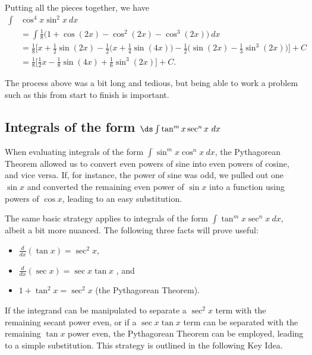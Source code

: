 \begin{example}
Putting all the pieces together, we have
\begin{align*}
	\int &\cos^4x\sin^2x\ dx \\
	&=\int \frac18\big(1+\cos(2x)-\cos^2(2x)-\cos^3(2x)\big)\ dx \\
	&= \frac18
	\Big[x+\frac12\sin(2x)-\frac12\big(x+\frac14\sin(4x)\big)
	-\frac12\Big(\sin(2x)-\frac13\sin^3(2x)\Big)\Big]
	+C \\
	&=\frac18\Big[\frac12x-\frac18\sin(4x)+\frac16\sin^3(2x)\Big]+C.
\end{align*}
\end{example}

The process above was a bit long and tedious, but being able to work a problem such as this from start to finish is important.

\subsection{\texorpdfstring{Integrals of the form $\ds\int\tan^mx\sec^nx\ dx$}{Integrands of the form (tan x)\^{}m (sec x)\^{}n}}

When evaluating integrals of the form $\int \sin^mx\cos^nx\ dx$, the Pythagorean Theorem allowed us to convert even powers of sine into even powers of cosine, and vice versa. If, for instance, the power of sine was odd, we pulled out one $\sin x$ and converted the remaining even power of $\sin x$ into a function using powers of $\cos x$, leading to an easy substitution.

The same basic strategy applies to integrals of the form $\int \tan^mx\sec^n x\ dx$, albeit a bit more nuanced. The following three facts will prove useful:
\begin{itemize}
\item $\frac{d}{dx}(\tan x) = \sec^2x$, 
\item $\frac{d}{dx}(\sec x) = \sec x\tan x$ , and 
\item	$1+\tan^2x = \sec^2x$ (the Pythagorean Theorem).
\end{itemize}

If the integrand can be manipulated to separate a $\sec^2x$ term with the remaining secant power even, or if a $\sec x\tan x$ term can be separated with the remaining $\tan x$ power even, the Pythagorean Theorem can be employed, leading to a simple substitution. This strategy is outlined in the following Key Idea.

